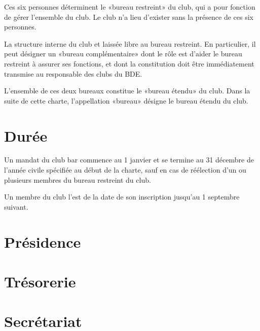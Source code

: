 \documentclass{article} %
\begin{document}
\begin{multicols}{2}
{			Ces six personnes déterminent le «bureau restreint» du club, qui a
			pour fonction de gérer l'ensemble du club. Le club n'a lieu
			d'exister sans la présence de ces six personnes.

			La structure interne du club et laissée libre au bureau restreint.
			En particulier, il peut désigner un «bureau complémentaire» dont le
			rôle est d'aider le bureau restreint à assurer ses fonctions, et
			dont la constitution doit être immédiatement transmise au
			responsable des clubs du BDE\@.

			L'ensemble de ces deux bureaux constitue le «bureau étendu» du club.
			Dans la suite de cette charte, l'appellation «bureau» désigne le
			bureau étendu du club.

		}

		\section{Durée}
\label{sec:duree}

		{\small
		
			Un mandat du club bar commence au 1 janvier et se termine au
			31 décembre de l'année civile spécifiée au début de la charte, sauf
			en cas de réélection d'un ou plusieurs membres du bureau restreint
			du club.

			Un membre du club l'est de la date de son inscription jusqu'au
			1 septembre suivant.

		}

		\section{Présidence}
\label{sec:presidence}

		\section{Trésorerie}
\label{sec:tresorerie}

		\section{Secrétariat}
\label{sec:secretariat}

	\end{multicols}
\end{document}

